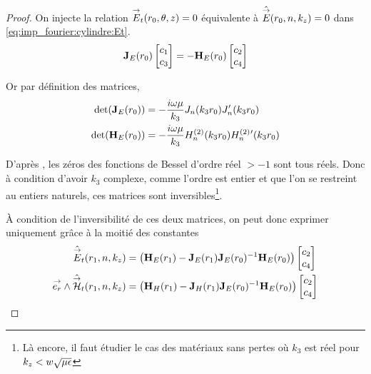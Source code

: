         \begin{proof}

            On injecte la relation \({\overset{\rightarrow}{E}}_t(r_0,\theta,z) = 0\) équivalente à \(\hat {{\overset{\rightarrow}{E}}}(r_0,n,k_z) = 0\) dans \eqref{eq:imp_fourier:cylindre:Et}.
            \begin{equation}
                \mathbf{J}_{E}(r_0)
                \begin{bmatrix}
                    c_1 \\
                    c_3
                \end{bmatrix}
                =-\mathbf{H}_{E}(r_0)
                \begin{bmatrix}
                    c_2 \\
                    c_4
                \end{bmatrix}
            \end{equation}

            Or par définition des matrices,
            \begin{align}
                \det(\mathbf{J}_E(r_0)) &= -\dfrac{i\omega\mu}{k_3}J_n(k_3r_0)J_n'(k_3r_0)
                \\
                \det(\mathbf{H}_E(r_0)) &= -\dfrac{i\omega\mu}{k_3}H_n^{(2)}(k_3r_0)H_n^{(2)}{}'(k_3r_0)
            \end{align}

            D’après \cite[p.~370]{abramowitz_handbook_1964}, les zéros des fonctions de Bessel d'ordre réel \(>-1\) sont tous réels.
            Donc à condition d'avoir \(k_3\) complexe, comme l'ordre est entier et que l'on se restreint au entiers naturels, ces matrices sont inversibles\footnote{Là encore, il faut étudier le cas des matériaux sans pertes où \(k_3\) est réel pour \(k_z < w\sqrt{\mu\epsilon}\)}.
            
            À condition de l'inversibilité de ces deux matrices, on peut donc exprimer uniquement grâce à la moitié des constantes
            \begin{align}
                \hat {{\overset{\rightarrow}{E}}}_t(r_1,n,k_z) &= 
                \left(\mathbf{H}_{E}(r_1) - \mathbf{J}_{E}(r_1)\mathbf{J}_{E}(r_0)^{-1}\mathbf{H}_{E}(r_0)\right)
                \begin{bmatrix}
                    c_2 \\
                    c_4
                \end{bmatrix}
                \\
                {\overset{\rightarrow}{e_r}}\wedge \hat {{\overset{\rightarrow}{\mathcal{H}}}}_t(r_1,n,k_z) &= 
                \left(\mathbf{H}_{H}(r_1) - \mathbf{J}_{H}(r_1)\mathbf{J}_{E}(r_0)^{-1}\mathbf{H}_{E}(r_0) \right)
                \begin{bmatrix}
                    c_2 \\
                    c_4
                \end{bmatrix}
            \end{align}


\end{proof}
